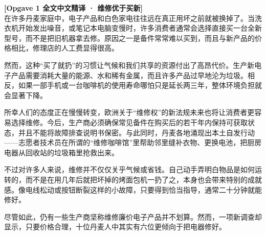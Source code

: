 \begin{transbox}
\small
\textbf{\color{NCDTeal}[Opgave 1 全文中文精译 · 维修优于买新]}\\
在许多丹麦家庭中，电子产品和白色家电往往远在真正用坏之前就被换掉了。当洗衣机开始发出噪音，或笔记本电脑变慢时，许多消费者通常会选择直接买一台全新型号，而不是把旧机器拿去修。原因之一是备件常常难以买到，而且与新产品的价格相比，修理店的人工费显得很高。

然而，这种“买了就扔”的习惯让气候和我们共享的资源付出了高昂代价。生产新电子产品需要消耗大量的能源、水和稀有金属，而且许多产品过早地沦为垃圾。相反，如果一部手机或一台咖啡机的使用寿命哪怕只是延长两三年，整体环境负担就会显著下降。

所幸人们的态度正在慢慢转变，欧洲关于“维修权”的新法规未来也将让消费者更容易选择维修。今后，生产商必须确保常见备件在购买后的若干年内保持可获取状态，并且不能将故障排查说明书保密。与此同时，丹麦各地涌现出本土自发行动——志愿者技术员在所谓的“维修咖啡馆”里帮助邻里缝补衣物、更换电池，把厨房电器从回收站的垃圾箱里抢救出来。

不过对许多人来说，维修并不仅仅关乎气候或省钱。自己动手弄明白物品是如何运转的，而不是在用几年后就把坏掉的烤面包机一扔了之，本身也会带来特别的成就感。像电线松动或按钮断裂这样的小故障，只要得到恰当指导，通常二十分钟就能修好。

尽管如此，仍有一些生产商坚称维修廉价电子产品并不划算。然而，一项新调查却显示，只要价格合理，十位丹麦人中其实有六位更倾向于把电器修好。
\end{transbox}


